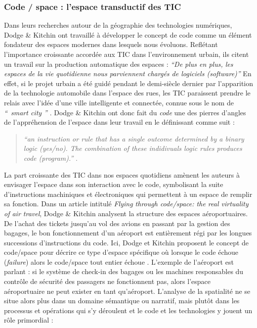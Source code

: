 \subsubsection[Code / space : l’espace transductif des TIC]{Code / space : l’espace transductif des TIC}

Dans leurs recherches autour de la géographie des technologies numériques, Dodge \& Kitchin ont travaillé à développer le concept de code comme un élément fondateur des espaces modernes dans lesquels nous évoluons. Reflétant l’importance croissante accordée aux TIC dans l’environnement urbain, ils citent un travail sur la production automatique des espaces : \textit{“De plus en plus, les espaces de la vie  quotidienne nous parviennent chargés de logiciels (software)”} \citep{Thrift2002} En effet, si le projet urbain a été guidé pendant le demi-siècle dernier par l’apparition de la technologie automobile dans l’espace des rues, les TIC paraissent prendre le relais avec l’idée d’une ville intelligente et connectée, connue sous le nom de \textit{`` smart city ''} \citep{Ascher2009,Picon2014}. Dodge \& Kitchin ont donc fait du \textit{code} une des pierres d’angles de l’appréhension de l’espace dans leur travail en le définissant comme suit : 

\begin{quote}
\textit{``an instruction or rule that has a single outcome determined by a binary logic (yes/no). The combination of these indidivuals logic rules produces code (program).''} \citep{Kitchin2011}.
\end{quote}

La part croissante des TIC dans nos espaces quotidiens amènent les auteurs à envisager l’espace dans son interaction avec le code, symbolisant la suite d’instructions machiniques et électroniques qui permettent à un espace de remplir sa fonction. Dans un article intitulé \textit{Flying through code/space: the real virtuality of air travel}, Dodge \& Kitchin analysent la structure des espaces aéroportuaires. De l’achat des tickets jusqu’au vol des avions en passant par la gestion des bagages, le bon fonctionnement d’un aéroport est entièrement régi par les longues successions d’instructions du code. Ici, Dodge et Kitchin proposent le concept de code/space pour décrire ce type d’espace spécifique où lorsque le code échoue (\textit{failure}) alors le code/space tout entier échoue \citep{Dodge2004}. L’exemple de l’aéroport est parlant : si le système de check-in des bagages ou les machines responsables du contrôle de sécurité des passagers ne fonctionnent pas, alors l’espace aéroportuaire ne peut exister en tant qu’aéroport. L’analyse de la spatialité ne se situe alors plus dans un domaine sémantique ou narratif, mais plutôt dans les processus et opérations qui s’y déroulent et le code et les technologies y jouent un rôle primordial : 

